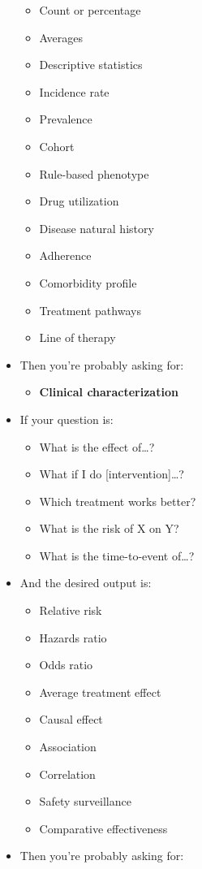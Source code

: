 \documentclass[11pt]{book}
\providecommand{\tightlist}{%
  \setlength{\itemsep}{0pt}\setlength{\parskip}{0pt}}
\theoremstyle{definition}
\theoremstyle{definition}
\theoremstyle{definition}
\theoremstyle{remark}
\begin{document}
\begin{itemize}
  \begin{itemize}
  \tightlist
  \item
    Count or percentage
  \item
    Averages
  \item
    Descriptive statistics
  \item
    Incidence rate
  \item
    Prevalence
  \item
    Cohort
  \item
    Rule-based phenotype
  \item
    Drug utilization
  \item
    Disease natural history
  \item
    Adherence
  \item
    Comorbidity profile
  \item
    Treatment pathways
  \item
    Line of therapy
  \end{itemize}
\item
  Then you're probably asking for:

  \begin{itemize}
  \tightlist
  \item
    \textbf{Clinical characterization}
  \end{itemize}
\item
  If your question is:

  \begin{itemize}
  \tightlist
  \item
    What is the effect of\ldots?
  \item
    What if I do {[}intervention{]}\ldots?
  \item
    Which treatment works better?
  \item
    What is the risk of X on Y?
  \item
    What is the time-to-event of\ldots?
  \end{itemize}
\item
  And the desired output is:

  \begin{itemize}
  \tightlist
  \item
    Relative risk
  \item
    Hazards ratio
  \item
    Odds ratio
  \item
    Average treatment effect
  \item
    Causal effect
  \item
    Association
  \item
    Correlation
  \item
    Safety surveillance
  \item
    Comparative effectiveness
  \end{itemize}
\item
  Then you're probably asking for:


\end{itemize}
\end{document}
